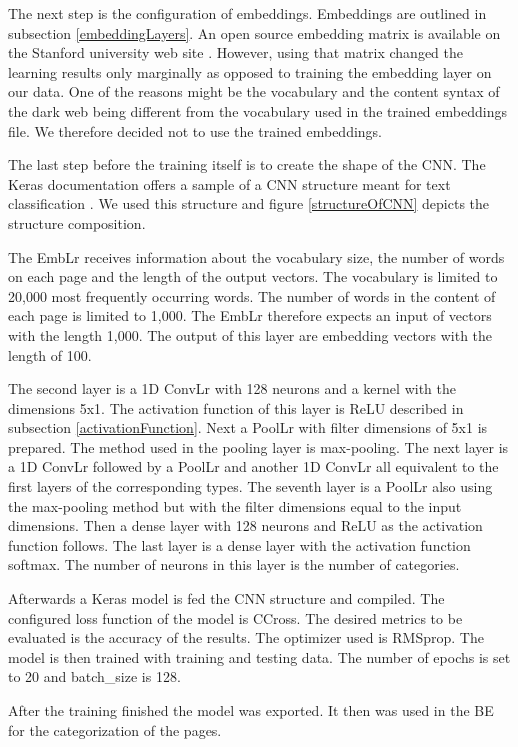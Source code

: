 The next step is the configuration of embeddings. Embeddings are outlined in subsection \ref{embeddingLayers}. An open source embedding matrix is available on the Stanford university web site \cite{embeddings}. However, using that matrix changed the learning results only marginally as opposed to training the embedding layer on our data. One of the reasons might be the vocabulary and the content syntax of the dark web being different from the vocabulary used in the trained embeddings file. We therefore decided not to use the trained embeddings.

The last step before the training itself is to create the shape of the CNN. The Keras documentation offers a sample of a CNN structure meant for text classification \cite{kerasCNNStructure}. We used this structure and figure \ref{structureOfCNN} depicts the structure composition. 

The EmbLr receives information about the vocabulary size, the number of words on each page and the length of the output vectors. The vocabulary is limited to 20,000 most frequently occurring words. The number of words in the content of each page is limited to 1,000. The EmbLr therefore expects an input of vectors with the length 1,000. The output of this layer are embedding vectors with the length of 100. 

The second layer is a 1D ConvLr with 128 neurons and a kernel with the dimensions 5x1. The activation function of this layer is ReLU described in subsection \ref{activationFunction}. Next a PoolLr with filter dimensions of 5x1 is prepared. The method used in the pooling layer is max-pooling. The next layer is a 1D ConvLr followed by a PoolLr and another 1D ConvLr all equivalent to the first layers of the corresponding types. The seventh layer is a PoolLr also using the max-pooling method but with the filter dimensions equal to the input dimensions. Then a dense layer with 128 neurons and ReLU as the activation function follows. The last layer is a dense layer with the activation function softmax. The number of neurons in this layer is the number of categories.

Afterwards a Keras model is fed the CNN structure and compiled. The configured loss function of the model is CCross. The desired metrics to be evaluated is the accuracy of the results. The optimizer used  is RMSprop. The model is then trained with training and testing data. The number of epochs is set to 20 and batch\_size is 128.

After the training finished the model was exported. It then was used in the BE for the categorization of the pages.

